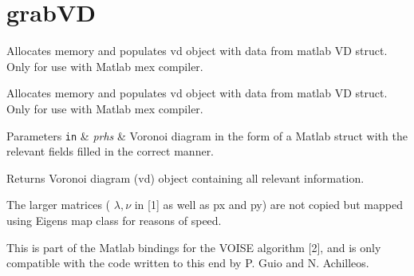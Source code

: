 \hypertarget{group__grabVD}{}\section{grab\+VD}
\label{group__grabVD}


Allocates memory and populates vd object with data from matlab VD struct. Only for use with Matlab mex compiler.  


Allocates memory and populates vd object with data from matlab VD struct. Only for use with Matlab mex compiler. 


\begin{DoxyParams}[1]{Parameters}
\mbox{\tt in}  & {\em prhs} & Voronoi diagram in the form of a Matlab struct with the relevant fields filled in the correct manner. \\
\hline
\end{DoxyParams}
\begin{DoxyReturn}{Returns}
Voronoi diagram (vd) object containing all relevant information.
\end{DoxyReturn}
The larger matrices ( $ \lambda, \nu $ in \mbox{[}1\mbox{]} as well as px and py) are not copied but mapped using Eigen\textquotesingle{}s map class for reasons of speed.

This is part of the Matlab bindings for the V\+O\+I\+SE algorithm \mbox{[}2\mbox{]}, and is only compatible with the code written to this end by P. Guio and N. Achilleos. 